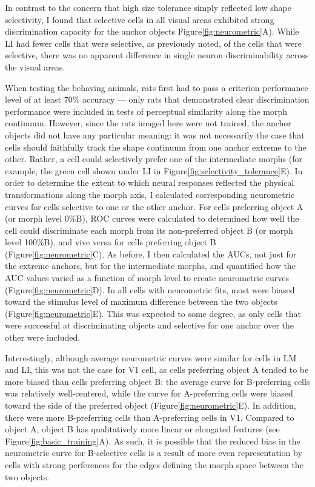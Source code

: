 In contrast to the concern that high size tolerance simply reflected low shape selectivity, I found that selective cells in all visual areas exhibited strong discrimination capacity for the anchor objects Figure\ref{fig:neurometric}A). While LI had fewer cells that were selective, as previously noted, of the cells that were selective, there was no apparent difference in single neuron discriminability across the visual areas. 

When testing the behaving animals, rats first had to pass a criterion performance level of at least 70\% accuracy --- only rats that demonstrated clear discrimination performance were included in tests of perceptual similarity along the morph continuum. However, since the rats imaged here were not trained, the anchor objects did not have any particular meaning: it was not necessarily the case that cells should faithfully track the shape continuum from one anchor extreme to the other. Rather, a cell could selectively prefer one of the intermediate morphs (for example, the green cell shown under LI in Figure\ref{fig:selectivity_tolerance}E). In order to determine the extent to which neural responses reflected the physical transformations along the morph axis, I calculated corresponding neurometric curves for cells selective to one or the other anchor. For cells preferring object A (or morph level 0\%B), ROC curves were calculated to determined how well the cell could discriminate each morph from its non-preferred object B (or morph level 100\%B), and vive versa for cells preferring object B (Figure\ref{fig:neurometric}C). As before, I then calculated the AUCs, not just for the extreme anchors, but for the intermediate morphs, and quantified how the AUC values varied as a function of morph level to create neurometric curves (Figure\ref{fig:neurometric}D). In all cells with neurometric fits, most were biased toward the stimulus level of maximum difference between the two objects (Figure\ref{fig:neurometric}E). This was expected to some degree, as only cells that were successful at discriminating objects and selective for one anchor over the other were included. 

Interestingly, although average neurometric curves were similar for cells in LM and LI, this was not the case for V1 cell, as cells preferring object A tended to be more biased than cells preferring object B: the average curve for B-preferring cells was relatively well-centered, while the curve for A-preferring cells were biased toward the side of the preferred object (Figure\ref{fig:neurometric}E). In addition, there were more B-preferring cells than A-preferring cells in V1. Compared to object A, object B has qualitatively more linear or elongated features (see Figure\ref{fig:basic_training}A). As such, it is possible that the reduced bias in the neurometric curve for B-selective cells is a result of more even representation by cells with strong perferences for the edges defining the morph space between the two objects.

